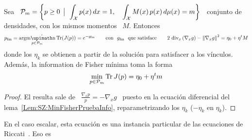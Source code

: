 %
\begin{corolario}
\label{Cor:SZ:MinFisherRiccati}
%
Sea  \  $\displaystyle  \mathcal{P}_m =  \left\{  p  \ge  0  \:\: \big| \:\:   \int_{\mathcal{X}} p(x)  \,  dx  =
  1,  \quad  \int_{\mathcal{X}} M(x)  \,  p(x)  \, d\mu(x)  =  m  \right\}$ \  conjunto  de
  densidades, con los mismos momentos \ $M$. Entonces
  \[
  p_{\mathrm{fm}}      =     \argmin_{p      \in      \P_m}     \Tr(J(p))      =
  e^{- g_{\mathrm{fm}}}   \qquad  \mbox{con   \   $g_{\mathrm{fm}}$  \   que
  satisface} \qquad 2 \, \div_x\left( \nabla_x g \right) - \left\| \nabla_x g \right\|^2 = \eta_0 + \eta^t M
  \]
  donde los $\eta_k$ se obtienen a partir de la soluci\'on para satisfacer a los
  v\'inculos. Adem\'as, la information de Fisher m\'inima toma la forma
%
\[
\min_{p \in \mathcal{P}_m} \operatorname{Tr} J(p) = \eta_0 + \eta^t m
\]
%
\end{corolario}
%
\begin{proof}
El  resulta sale  de \  $\frac{\nabla_x  p}{p} =  -\nabla_x  g$ \  puesto en  la
ecuaci\'on      diferencial      del      lema~\ref{Lem:SZ:MinFisherPruebaInfo},
reparametrizando los $\eta_k$ ($-\eta_k$ en $\eta_k$).
\end{proof}

En  el  caso  escalar,  esta  ecuaci\'on es  una  instancia  particular  de  las
ecuaciones de Riccati~\cite{Ric1724, Ric59}. Eso es






